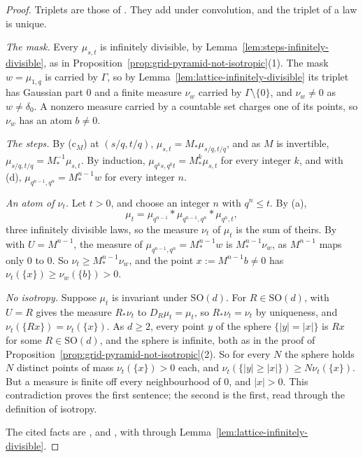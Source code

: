 \begin{proof}
Triplets are those of . They add under convolution, and the triplet of a law is unique.

\emph{The mask.} Every $\mu_{s,t}$ is infinitely divisible, by
Lemma~\ref{lem:steps-infinitely-divisible}, as in Proposition~\ref{prop:grid-pyramid-not-isotropic}(1).
The mask $w = \mu_{1,q}$ is carried by $\Gamma$, so by Lemma~\ref{lem:lattice-infinitely-divisible}
its triplet has Gaussian part $0$ and a finite \Levy{} measure $\nu_w$ carried by
$\Gamma \setminus \{0\}$, and $\nu_w \ne 0$ as $w \ne \delta_0$. A nonzero measure carried by a
countable set charges one of its points, so $\nu_w$ has an atom $b \ne 0$.

\emph{The steps.} By (c$_M$) at $(s/q, t/q)$, $\mu_{s,t} = M_*\mu_{s/q,t/q}$, and as $M$ is
invertible, $\mu_{s/q,t/q} = M^{-1}_*\mu_{s,t}$. By induction,
$\mu_{q^ks,q^kt} = M^k_*\mu_{s,t}$ for every integer $k$, and with (d),
$\mu_{q^{n-1},q^n} = M^{n-1}_*w$ for every integer $n$.

\emph{An atom of $\nu_t$.} Let $t > 0$, and choose an integer $n$ with $q^n \le t$. By (a),
\[
\mu_t = \mu_{q^{n-1}} * \mu_{q^{n-1},q^n} * \mu_{q^n,t} ,
\]
three infinitely divisible laws, so the \Levy{} measure $\nu_t$ of $\mu_t$ is the sum of theirs. By
 with $U = M^{n-1}$, the \Levy{} measure of $\mu_{q^{n-1},q^n} = M^{n-1}_*w$ is
$M^{n-1}_*\nu_w$, as $M^{n-1}$ maps only $0$ to $0$. So $\nu_t \ge M^{n-1}_*\nu_w$, and the point
$x := M^{n-1}b \ne 0$ has $\nu_t(\{x\}) \ge \nu_w(\{b\}) > 0$.

\emph{No isotropy.} Suppose $\mu_t$ is invariant under $\mathrm{SO}(d)$. For
$R \in \mathrm{SO}(d)$,  with $U = R$ gives the \Levy{} measure $R_*\nu_t$ to
$D_R\mu_t = \mu_t$, so $R_*\nu_t = \nu_t$ by uniqueness, and $\nu_t(\{Rx\}) = \nu_t(\{x\})$. As
$d \ge 2$, every point $y$ of the sphere $\{|y| = |x|\}$ is $Rx$ for some $R \in \mathrm{SO}(d)$, and
the sphere is infinite, both as in the proof of Proposition~\ref{prop:grid-pyramid-not-isotropic}(2).
So for every $N$ the sphere holds $N$ distinct points of mass $\nu_t(\{x\}) > 0$ each, and
$\nu_t(\{|y| \ge |x|\}) \ge N\nu_t(\{x\})$. But a \Levy{} measure is finite off every
neighbourhood of $0$, and $|x| > 0$. This contradiction proves the first sentence; the second is the
first, read through the definition of isotropy.

The cited facts are
,  and , with  through
Lemma~\ref{lem:lattice-infinitely-divisible}.
\end{proof}

